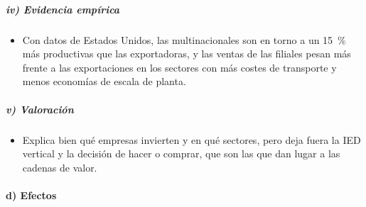 \documentclass[11pt]{article}
\begin{document}
\subparagraph{iv) Evidencia empírica}

\begin{itemize}
\item Con datos de Estados Unidos, las multinacionales son en torno a un 15~\% más productivas que las exportadoras, y las ventas de las filiales pesan más frente a las exportaciones en los sectores con más costes de transporte y menos economías de escala de planta\nocite{HelpmanMelitzYeaple2004Export}.
\end{itemize}

\subparagraph{v) Valoración}

\begin{itemize}
\item Explica bien qué empresas invierten y en qué sectores, pero deja fuera la IED vertical y la decisión de hacer o comprar, que son las que dan lugar a las cadenas de valor\nocite{AntrasYeaple2014}.
\end{itemize}

\paragraph{d) Efectos}
\end{document}
